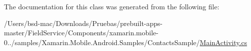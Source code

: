 The documentation for this class was generated from the following file\+:\begin{DoxyCompactItemize}
\item 
/\+Users/bsd-\/mac/\+Downloads/\+Pruebas/prebuilt-\/apps-\/master/\+Field\+Service/\+Components/xamarin.\+mobile-\/0../samples/\+Xamarin.\+Mobile.\+Android.\+Samples/\+Contacts\+Sample/\hyperlink{xamarin_8mobile-0_86_81_2samples_2_xamarin_8_mobile_8_android_8_samples_2_contacts_sample_2_main_activity_8cs}{Main\+Activity.\+cs}\end{DoxyCompactItemize}
